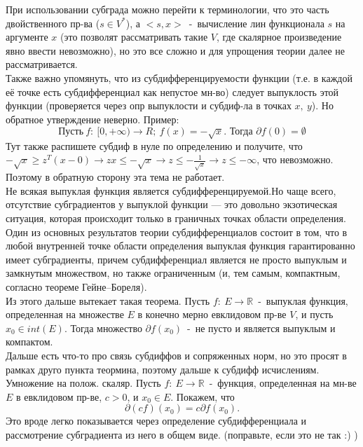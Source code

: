 При использовании субграда можно перейти к терминологии, что это часть двойственного пр-ва ($s \in V^{*}$), а $<s,x>$~-~вычисление лин функционала $s$ на аргументе $x$ (это позволят рассматривать такие $V$, где скалярное произведение явно ввести невозможно), но это все сложно и для упрощения теории далее не рассматривается.\\
Также важно упомянуть, что из субдифференцируемости функции (т.е. в каждой её точке есть субдифференциал как непустое мн-во) следует выпуклость этой функции (проверяется через опр выпуклости и субдиф-ла в точках $x,~y$). Но обратное утверждение неверно. Пример:
$$
\text{Пусть}~f:~[0,+\infty) \to R;~f(x)=-\sqrt{x}. \text{~Тогда~} \partial f(0)=\emptyset
$$
Тут также распишете субдиф в нуле по определению и получите, что $-\sqrt{x} \geq z^T(x - 0) \to zx \leq -\sqrt{x} \to z \leq -\frac{1}{\sqrt{x}} \to z \leq -\infty$, что невозможно. Поэтому в обратную сторону эта тема не работает.\\

Не всякая выпуклая функция является субдифференцируемой.Но чаще всего, отсутствие субградиентов у выпуклой функции — это довольно экзотическая ситуация, которая происходит только в граничных точках области определения. Один из основных результатов теории субдифференциалов состоит в том, что в любой внутренней точке области определения выпуклая функция гарантированно имеет субградиенты, причем субдифференциал является не просто выпуклым и замкнутым множеством, но также ограниченным (и, тем самым, компактным, согласно теореме Гейне–Бореля).\\

Из этого дальше вытекает такая теорема. Пусть $f:~E \to \mathbb{R}$~-~выпуклая функция, определенная на множестве $E$ в конечно мерно евклидовом пр-ве $V$, и пусть $x_0 \in int(E)$. Тогда множество $\partial f(x_0)$~-~не пусто и является выпуклым и компактом.\\
Дальше есть что-то про связь субдиффов и сопряженных норм, но это просят в рамках друго пункта теормина, поэтому дальше к субдифф исчислениям.\\

Умножение на полож. скаляр. Пусть $f:~E \to \mathbb{R}$~-~функция, определенная на мн-ве $E$ в евклидовом пр-ве, $c > 0$, и $x_0  \in E$. Покажем, что
$$
\partial (cf)(x_0)=c \partial f(x_0).
$$
Это вроде легко показывается через определение субдифференциала и рассмотрение субградиента из него в общем виде. (поправьте, если это не так :) )\\

